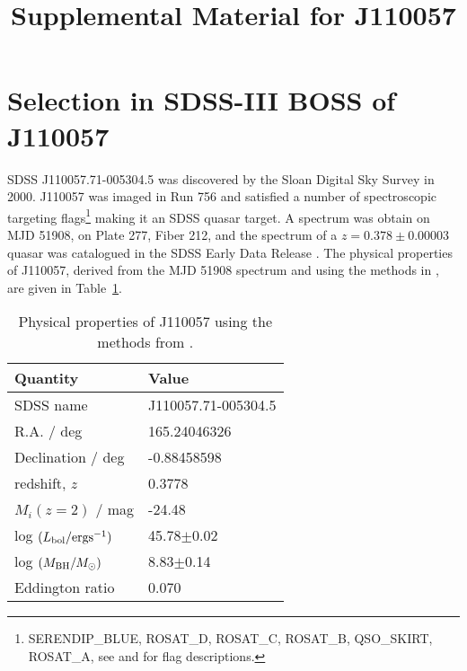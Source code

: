 \documentclass[11pt,a4paper]{article}
\begin{document}
   \title{Supplemental Material for J110057}
\maketitle


\section*{Selection in SDSS-III BOSS of J110057}
SDSS J110057.71-005304.5 was discovered by the Sloan Digital Sky
Survey in 2000.  J110057 was imaged in Run 756 and satisfied a number
of spectroscopic targeting flags\footnote{SERENDIP\_BLUE, ROSAT\_D,
ROSAT\_C, ROSAT\_B, QSO\_SKIRT, ROSAT\_A, see \citet{EDR} and
\citet{Richards2002} for flag descriptions.}  making it an SDSS quasar
target. A spectrum was obtain on MJD 51908, on Plate 277, Fiber 212,
and the spectrum of a $z=0.378\pm0.00003$ quasar was catalogued in the
SDSS Early Data Release \citep{Schneider2002}. The physical properties
of J110057, derived from the MJD 51908 spectrum and using the methods
in \citet{Shen2011}, are given in Table~\ref{tab:Shen_props}.

\begin{table}[]
    \centering
    \begin{tabular}{l l }
      \hline \hline 
      Quantity &  Value \\
      \hline 
      SDSS name        &        J110057.71-005304.5 \\
      R.A. / deg                   &  165.24046326 \\
      Declination / deg        &   -0.88458598 \\ 
      redshift, $z$     &   0.3778 \\
      $M_{i}(z=2)$  / mag                 &   -24.48  \\
      log $(L_{\rm bol} / {\rm erg s}^{-1}) $   &  45.78$\pm$0.02 \\
      log $(M_{\rm BH} / M_{\odot})  $   &  8.83$\pm$0.14 \\
      Eddington ratio  &        0.070 \\
      \hline \hline 
    \end{tabular}
    \caption{Physical properties of J110057 using the methods from 
      \citet{Shen2011}.} 
    \label{tab:Shen_props}
\end{table}
\end{document}
